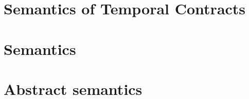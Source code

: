 
\section{Semantics of Temporal Contracts} \label{sec:temporal-semantics}



\section{Semantics}\label{sec:technical}



\section{Abstract semantics}

